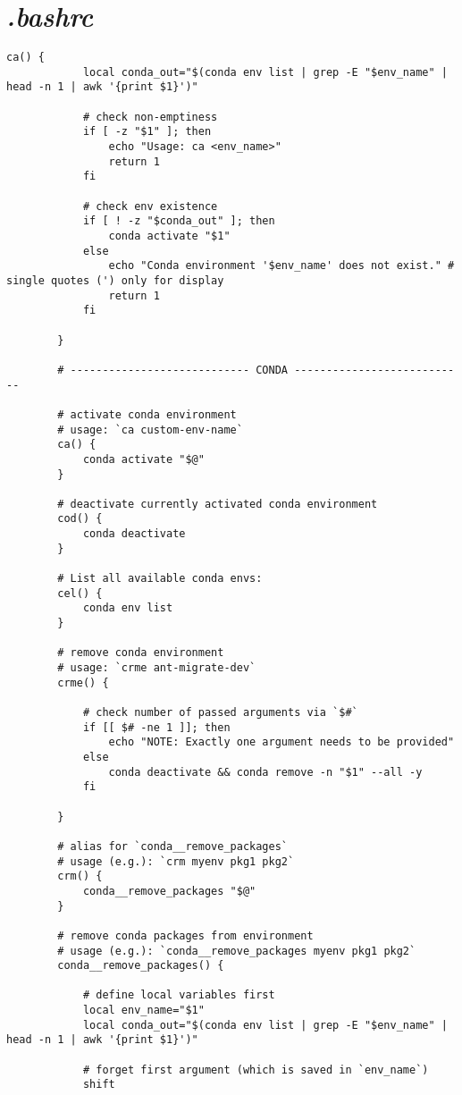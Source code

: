 \documentclass[12pt, a4paper]{article}
\numberwithin{equation}{section}
\theoremstyle{definition}
\theoremstyle{definition}
\begin{document}
	\newpage
	\appendix 
	
	\section{\textit{.bashrc}}
	\label{app:bashrc_file}
	
	\begin{lstlisting}[style=mystylebash, label=alg:bashrc_contents, caption=Contents of .bashrc file, xleftmargin=\parindent]
		ca() {
			local conda_out="$(conda env list | grep -E "$env_name" | head -n 1 | awk '{print $1}')"
			
			# check non-emptiness
			if [ -z "$1" ]; then
				echo "Usage: ca <env_name>"
				return 1
			fi
			
			# check env existence
			if [ ! -z "$conda_out" ]; then
				conda activate "$1"
			else
				echo "Conda environment '$env_name' does not exist." # single quotes (') only for display 
				return 1
			fi
			
		}
		
		# ---------------------------- CONDA ---------------------------
		
		# activate conda environment
		# usage: `ca custom-env-name`
		ca() {
			conda activate "$@"
		}
	
		# deactivate currently activated conda environment
		cod() {
			conda deactivate
		}
		
		# List all available conda envs: 
		cel() {
			conda env list
		}
		
		# remove conda environment
		# usage: `crme ant-migrate-dev` 
		crme() {

			# check number of passed arguments via `$#`
			if [[ $# -ne 1 ]]; then
				echo "NOTE: Exactly one argument needs to be provided"
			else
				conda deactivate && conda remove -n "$1" --all -y
			fi
			
		}
		
		# alias for `conda__remove_packages`
		# usage (e.g.): `crm myenv pkg1 pkg2`
		crm() {
			conda__remove_packages "$@"
		}

		# remove conda packages from environment
		# usage (e.g.): `conda__remove_packages myenv pkg1 pkg2`
		conda__remove_packages() {
			
			# define local variables first
			local env_name="$1"
			local conda_out="$(conda env list | grep -E "$env_name" | head -n 1 | awk '{print $1}')"
			
			# forget first argument (which is saved in `env_name`)
			shift
			

\end{lstlisting}
\end{document}
